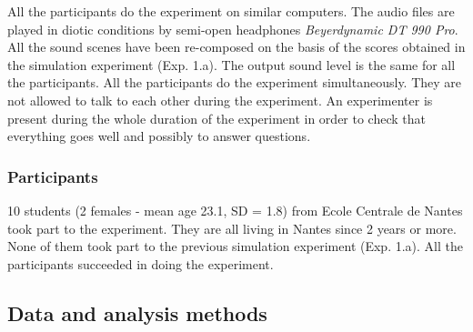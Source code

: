 \documentclass[twoside,twocolumn]{article}
\begin{document}
All the participants do the experiment on similar computers. The audio files are played in diotic conditions by semi-open headphones \emph{Beyerdynamic DT 990 Pro}. All the sound scenes have been re-composed on the basis of the scores obtained in the simulation experiment (Exp. 1.a). The output sound level is the same for all the participants.
All the participants do the experiment simultaneously. They are not allowed to talk to each other during the experiment.
An experimenter is present during the whole duration of the experiment in order to check that everything goes well and possibly to answer questions.


\subsubsection*{Participants}

%

10 students (2 females - mean age 23.1, SD = 1.8) from Ecole Centrale de Nantes took part to the experiment. They are all living in Nantes since 2 years or more. None of them took part to the previous simulation experiment (Exp. 1.a).
All the participants succeeded in doing the experiment.

\subsection{Data and analysis methods}
\label{sec:xp1_dataAna}
\end{document}
